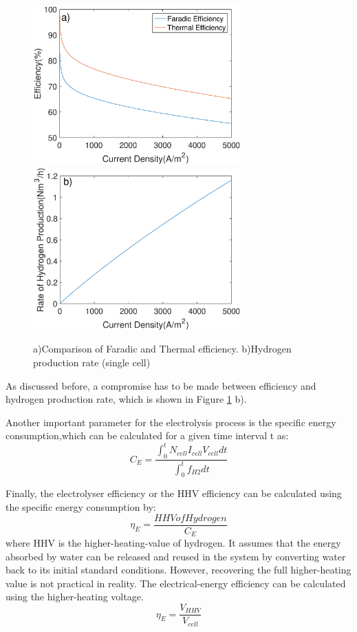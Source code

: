 \documentclass[11pt, a4paper]{article}
\begin{document}
\begin{figure}[H]
\includegraphics[width=8cm]{efficiency.eps} 
\includegraphics[width=8cm]{rate.eps}
\caption{a)Comparison of Faradic and Thermal efficiency. b)Hydrogen production rate (single cell)}
\label{fig:my}
\end{figure} 

As discussed before, a compromise has to be made between efficiency and hydrogen production rate, which is shown in Figure \ref{fig:my} b).

Another important parameter for the electrolysis process is the specific energy consumption,which can be calculated for a given time interval t as:\cite{efficiency2}
\begin{equation}
C_E = \frac{\int_{0}^{t} N_{cell}  {I_{cell}}  V_{cell} dt}{\int_{0}^{t} f_{H2}dt}
\end{equation}

Finally, the electrolyser efficiency or the HHV efficiency can be calculated using the specific energy consumption by:\cite{efficiency2}
\begin{equation}
\eta_E = \frac{HHV of Hydrogen}{C_E} 
\end{equation}
where HHV is the higher-heating-value of hydrogen. It assumes that the energy absorbed by water can be released and reused in the system by converting water back to its initial standard conditions. However, recovering the full higher-heating value is not practical in reality.
The electrical-energy efficiency can be calculated using the higher-heating voltage.\cite{efficiency} \cite{efficiency2} 
\begin{equation}
\eta_E=\frac{V_{HHV}}{V_{cell}}
\end{equation}
\end{document}
